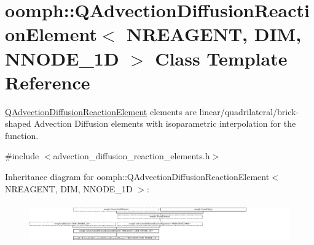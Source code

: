 \hypertarget{classoomph_1_1QAdvectionDiffusionReactionElement}{}\section{oomph\+:\+:Q\+Advection\+Diffusion\+Reaction\+Element$<$ N\+R\+E\+A\+G\+E\+NT, D\+IM, N\+N\+O\+D\+E\+\_\+1D $>$ Class Template Reference}
\label{classoomph_1_1QAdvectionDiffusionReactionElement}


\hyperlink{classoomph_1_1QAdvectionDiffusionReactionElement}{Q\+Advection\+Diffusion\+Reaction\+Element} elements are linear/quadrilateral/brick-\/shaped Advection Diffusion elements with isoparametric interpolation for the function.  




{\ttfamily \#include $<$advection\+\_\+diffusion\+\_\+reaction\+\_\+elements.\+h$>$}

Inheritance diagram for oomph\+:\+:Q\+Advection\+Diffusion\+Reaction\+Element$<$ N\+R\+E\+A\+G\+E\+NT, D\+IM, N\+N\+O\+D\+E\+\_\+1D $>$\+:\begin{figure}[H]
\begin{center}
\leavevmode
\includegraphics[height=1.751094cm]{classoomph_1_1QAdvectionDiffusionReactionElement}
\end{center}
\end{figure}
